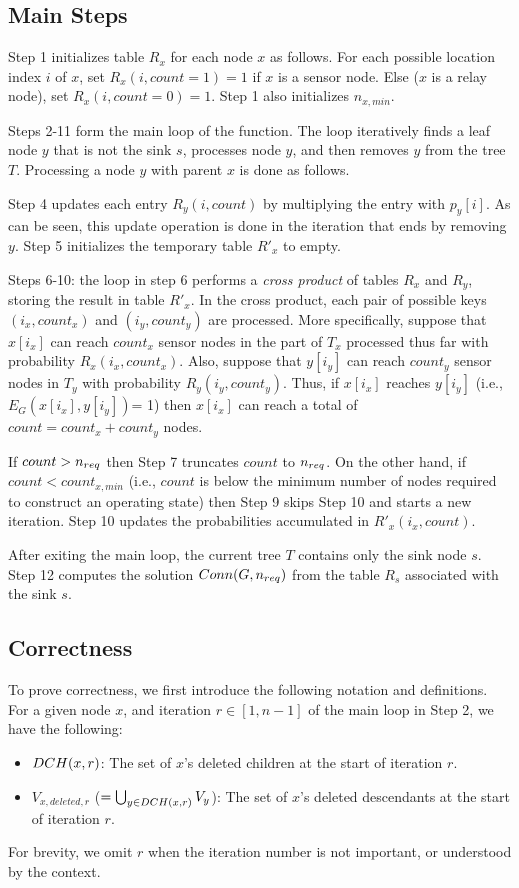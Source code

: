 \subsection{Main Steps}

Step 1 initializes table $R_x$ for each node $x$ as follows.
%
For each possible location index $i$ of $x$, set $R_x(i, count=1)= 1$
if $x$ is a sensor node.
Else ($x$ is a relay node), set $R_x(i, count=0)= 1$.
%
Step 1 also initializes $n_{x,min}$.


Steps 2-11 form the main loop of the function.
The loop iteratively finds a leaf node $y$ that is not the sink $s$, 
processes node $y$, and then removes $y$ from the tree $T$.
%
Processing a node $y$ with parent $x$ is done as follows.

Step 4 updates each entry $R_y (i,count)$ by multiplying the entry
with $p_y[i]$.
%
As can be seen, this update operation is done in the iteration that ends by
removing $y$.
%
Step 5 initializes the temporary table $R'_x$ to empty.


Steps 6-10: the loop in step 6 performs a {\em cross product} of tables
$R_x$ and $R_y$, storing the result in table $R'_x$.
%
In the cross product, each pair of possible keys $(i_x, count_x)$
and $(i_y, count_y)$ are processed.
%
More specifically, suppose that $x[i_x]$ can reach $count_x$ sensor nodes
in the part of $T_x$ processed thus far with probability $R_x(i_x,count_x)$.
%
Also, suppose that $y[i_y]$ can reach $count_y$ sensor nodes
in $T_y$ with probability $R_y(i_y,count_y)$.
%
Thus, if $x[i_x]$ reaches $y[i_y]$ (i.e., $E_G(x[i_x],y[i_y])$= 1)
then $x[i_x]$ can reach a total of $count= count_x + count_y$ nodes.


If $count > {n_{req}}$ then Step 7 truncates $count$ to ${n_{req}}$.
%
On the other hand, if $count < count_{x,min}$ (i.e., $count$ is below the
minimum number of nodes required to construct an operating state) then
Step 9 skips Step 10 and starts a new iteration.
%
Step 10 updates the probabilities accumulated in $R'_x(i_x,count)$. 


After exiting the main loop, the current tree $T$ contains only the
sink node $s$. Step 12 computes the solution $Conn(G,{n_{req}})$ from
the table $R_s$ associated with the sink $s$.

\subsection{Correctness}

To prove correctness, we first introduce the following notation and
definitions.
%
For a given node $x$, and iteration $r \in [1,n-1]$ of the main loop
in Step 2, we have the following:
%
\begin{itemize}
\item	${DCH} (x,r)$:
	The set of $x$'s deleted children at the start of iteration $r$.

\item	$V_{x,deleted,r}$ ($= \bigcup_{y \in {DCH}(x,r)} V_y$):
	The set of $x$'s deleted descendants at the start of iteration $r$.
\end{itemize}
%
For brevity, we omit $r$ when the iteration number is not important, or
understood by the context.


